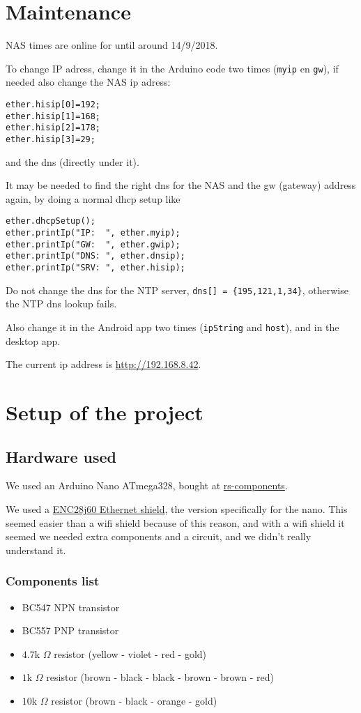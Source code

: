 \documentclass{article}
\begin{document}
	
	\tableofcontents
	\newpage
	
	\section{Maintenance}
		NAS times are online for until around 14/9/2018.
		
		To change IP adress, change it in the Arduino code two times (\verb|myip| en \verb|gw|), if needed also change the NAS ip adress:
		\begin{lstlisting}
ether.hisip[0]=192;
ether.hisip[1]=168;
ether.hisip[2]=178;
ether.hisip[3]=29;
		\end{lstlisting}
		and the dns (directly under it).
		
		It may be needed to find the right dns for the NAS and the gw (gateway) address again, by doing a normal dhcp setup like
		\begin{lstlisting}
ether.dhcpSetup();
ether.printIp("IP:  ", ether.myip);
ether.printIp("GW:  ", ether.gwip);
ether.printIp("DNS: ", ether.dnsip);
ether.printIp("SRV: ", ether.hisip);
		\end{lstlisting}
		Do not change the dns for the NTP server, \verb|dns[] = {195,121,1,34}|, otherwise the NTP dns lookup fails.
		
		Also change it in the Android app two times (\verb|ipString| and \verb|host|), and in the desktop app.
		
		The current ip address is \url{http://192.168.8.42}.
	
	\section{Setup of the project}
		\subsection{Hardware used}
		We used an Arduino Nano ATmega328, bought at \href{http://nl.rs-online.com/}{rs-components}.
		
		We used a \href{http://www.mijn-gadgets.nl/Webwinkel-Product-157562595/ENC28J60-Ethernet-Shield-Network-Module-V1.0-For-Arduino-Nano.html}{ENC28j60 Ethernet shield}, the version specifically for the nano. This seemed easier than a wifi shield because of this reason, and with a wifi shield it seemed we needed extra components and a circuit, and we didn't really understand it.
		
		\subsubsection{Components list}
			\begin{itemize}
				\item BC547 NPN transistor
				\item BC557 PNP transistor
				\item $4.7$k $\Omega$ resistor (yellow - violet - red - gold)
				\item $1$k $\Omega$ resistor (brown - black - black - brown - brown - red)
				\item $10$k $\Omega$ resistor (brown - black - orange - gold)
			\end{itemize}
	
\end{document}
